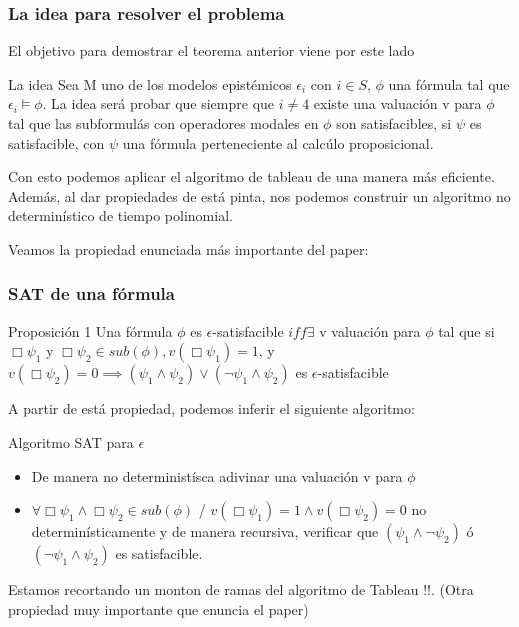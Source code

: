 \documentclass{beamer}
\begin{document}
\begin{frame}
\frametitle{La idea para resolver el problema}

El objetivo para demostrar el teorema anterior viene por este lado

\begin{block}{La idea}
Sea M uno de los modelos epist\'emicos $\epsilon_{i}$ con $i \in S$, $\phi$ una f\'ormula tal que $\epsilon_{i} \models \phi$. La idea ser\'a probar que siempre que $i \neq 4$ existe una valuaci\'on v para $\phi$ tal que las subformul\'as con operadores modales en $\phi$ son satisfacibles, si $\psi$ es satisfacible, con $\psi$ una f\'ormula perteneciente al calc\'ulo proposicional.
\end{block}

Con esto podemos aplicar el algoritmo de tableau de una manera m\'as eficiente. Adem\'as, al dar propiedades de est\'a pinta, nos podemos construir un algoritmo no determin\'istico de tiempo polinomial.

Veamos la propiedad enunciada m\'as importante del paper:
\end{frame}

\begin{frame}
\frametitle{SAT de una f\'ormula}

\begin{block}{Proposici\'on 1}
Una f\'ormula $\phi$ es $\epsilon$-satisfacible $iff \exists$ v valuaci\'on para $\phi$ tal que si $\Box\psi_{1}$ y $\Box \psi_{2} \in sub(\phi), v(\Box \psi_{1}) = 1$, y $v(\Box\psi_{2}) = 0 \implies (\psi_{1} \land \psi_{2}) \lor (\neg \psi_{1} \land \psi_{2})$ es $\epsilon$-satisfacible
\end{block}

A partir de est\'a propiedad, podemos inferir el siguiente algoritmo:

\begin{block}{Algoritmo SAT para $\epsilon$}
\begin{itemize}
	\item De manera no determinist\'isca adivinar una valuaci\'on v para $\phi$
	\item $\forall \Box\psi_{1} \land \Box\psi_{2} \in sub(\phi)$ / $v(\Box\psi_{1}) = 1 \land v(\Box\psi_{2}) = 0$ no determin\'isticamente y de manera recursiva, verificar que $(\psi_{1} \land \neg\psi_{2})$ \'o $(\neg\psi_{1}\land\psi_{2})$ es satisfacible.
\end{itemize}
\end{block}

Estamos recortando un monton de ramas del algoritmo de Tableau !!. (Otra propiedad muy importante que enuncia el paper)

\end{frame}
\end{document}
